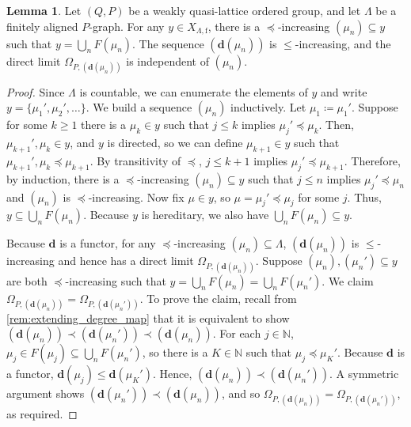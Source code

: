 \documentclass[11pt]{amsart}
\theoremstyle{definition}
\numberwithin{thm}{section}
\numberwithin{equation}{section}
\newtheorem{lemma}[thm]{Lemma}
\newcommand{\N}{\mathbb{N}}
\newcommand{\degree}{\mathbf{d}}
\newcommand{\principal}[1]{F(#1)}
\newcommand{\F}{\mathrm{f}}
\newcommand{\PS}[2]{X_{#2, #1}}
\begin{document}
\begin{lemma}
\label{lem:filters_are_unions_of_principal_filters}
Let $(Q, P)$ be a weakly quasi-lattice ordered group, and let $\Lambda$ be a finitely aligned $P$-graph.
For any $y \in \PS{\F}{\Lambda}$, there is a $\preceq$-increasing $(\mu_n) \subseteq y$ such that $y = \bigcup_{n}\principal{\mu_n}$. 
The sequence $(\degree(\mu_n))$ is $\leq$-increasing, and the direct limit $\Omega_{P, (\degree(\mu_n))}$ is independent of $(\mu_n)$.
\end{lemma}
\begin{proof}
Since $\Lambda$ is countable, we can enumerate the elements of $y$ and  write $y = \{\mu_1', \mu_2', \dots\}$. 
We build a sequence $(\mu_n)$ inductively. 
Let $\mu_1 \coloneqq \mu_1'$. 
Suppose for some $k \geq 1$ there is a $\mu_k \in y$ such that $j \leq k$ implies $\mu_j' \preceq \mu_k$. 
Then, $\mu_{k+1}', \mu_k \in y$, and $y$ is directed, so we can define  $\mu_{k+1} \in y$ such that $\mu_{k+1}', \mu_k \preceq \mu_{k+1}$. 
By transitivity of $\preceq$, $j \leq k+1$ implies $\mu_j' \preceq \mu_{k+1}$. 
Therefore, by induction, there is a $\preceq$-increasing $(\mu_n) \subseteq y$ such that $j \leq n$ implies $\mu_j' \preceq \mu_n$ and $(\mu_n)$ is $\preceq$-increasing. 
Now fix $\mu \in y$, so $\mu = \mu_j' \preceq \mu_j$ for some $j$. 
Thus, $y \subseteq \bigcup_{n}\principal{\mu_n}$. 
Because $y$ is hereditary, we also have $\bigcup_{n}\principal{\mu_n} \subseteq y$.

Because $\degree$ is a functor, for any $\preceq$-increasing $(\mu_n) \subseteq \Lambda$, $(\degree(\mu_n))$ is $\leq$-increasing and hence has a direct limit $\Omega_{P, (\degree(\mu_n))}$. 
Suppose $(\mu_n), (\mu_n') \subseteq y$ are both $\preceq$-increasing such that $y = \bigcup_{n}\principal{\mu_n} = \bigcup_{n} \principal{\mu_n'}$.
We claim $\Omega_{P, (\degree(\mu_n))} = \Omega_{P, (\degree(\mu_n'))}$. 
To prove the claim, recall from \cref{rem:extending_degree_map} that it is equivalent to show $(\degree(\mu_n)) \prec (\degree(\mu_n')) \prec (\degree(\mu_n))$.
For each $j \in \N$, $\mu_j \in \principal{\mu_j} \subseteq \bigcup_{n} \principal{\mu_n'}$, so there is a $K \in \N$ such that $\mu_j \preceq \mu_K'$.
Because $\degree$ is a functor, $\degree(\mu_j) \leq \degree(\mu_K')$.
Hence, $(\degree(\mu_n)) \prec (\degree(\mu_n'))$.
A symmetric argument shows $(\degree(\mu_n')) \prec (\degree(\mu_n))$, and so $\Omega_{P, (\degree(\mu_n))} = \Omega_{P, (\degree(\mu_n'))}$, as required.
\end{proof}
\end{document}
